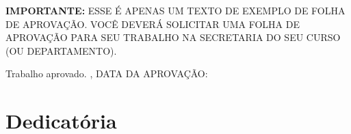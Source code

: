 \documentclass[
    12pt,               %
    openright,          %
    oneside,            %
    a4paper,            %
    section=TITLE,     %
    english,            %
    french,             %
    spanish,            %
    brazil              %
    ]{abntex2}
\renewcommand{\ABNTEXchapterfont}{\sffamily}
\renewcommand{\ABNTEXsubsectionfontsize}{\normalsize}
\renewcommand{\ABNTEXchapterfont}{\sffamily\bfseries}
\begin{document}


\begin{folhadeaprovacao}
  
  \begin{center}
    {\ABNTEXchapterfont\ABNTEXsubsectionfontsize\imprimirautor}

    \vspace*{\fill}\vspace*{\fill}
    {\ABNTEXchapterfont\ABNTEXsubsectionfontsize\bfseries\imprimirtitulo}
    \vspace*{\fill}
    
    \hspace{.45\textwidth}
    \begin{minipage}{.5\textwidth}
        \textbf{IMPORTANTE:} ESSE É APENAS UM TEXTO DE EXEMPLO DE FOLHA DE
        APROVAÇÃO. VOCÊ DEVERÁ SOLICITAR UMA FOLHA DE
        APROVAÇÃO PARA SEU TRABALHO NA SECRETARIA DO SEU CURSO (OU
        DEPARTAMENTO).
    \end{minipage}%
    \vspace*{\fill}
   \end{center}
        
   Trabalho aprovado. \imprimirlocal, DATA DA APROVAÇÃO:

      
   \begin{center}
    \vspace*{0.5cm}
    {\ABNTEXchapterfont\ABNTEXsubsectionfontsize\imprimirlocal}
    \par
    {\ABNTEXchapterfont\ABNTEXsubsectionfontsize\imprimirdata}
    \vspace*{1cm}
  \end{center}
  
\end{folhadeaprovacao}




\chapter*{Dedicatória}
\end{document}
